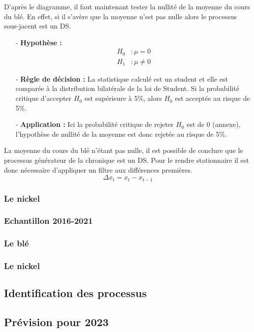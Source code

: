 %
D'après le diagramme, il faut maintenant tester la nullité de la moyenne du cours du blé. En effet, si il s'avère que la moyenne n'est pas nulle alors le processus 
sous-jacent est un DS.
\begin{itemize}
    \item[-]\textbf{Hypothèse :}
\begin{equation*}
\begin{split}
    H_{0} &: \mu = 0\\
    H_{1} &: \mu \neq 0
\end{split}
\end{equation*}
\item[-]\textbf{Règle de décision :} La statistique calculé est un student et elle est comparée à la distribution bilatérale de la loi de Student. Si la probabilité 
critique d'accepter $H_{0}$ est supérieure à 5\%, alors $H_{0}$ est acceptée au risque de 5\%.
\item[-]\textbf{Application :} Ici la probabilité critique de rejeter $H_{0}$ est de 0 (annexe), l'hypothèse de nullité de la moyenne est donc rejetée au risque de 5\%.
\end{itemize}
La moyenne du cours du blé n'étant pas nulle, il est possible de conclure que le processus générateur de la chronique est un DS. Pour le rendre stationnaire il est donc
nécessaire d'appliquer un filtre aux différences premières.
\begin{equation*}
    \Delta x_{t} = x_{t} - x_{t-1}
\end{equation*}
\subsubsection*{Le nickel}
\subsubsection{Echantillon 2016-2021}
\subsubsection*{Le blé}
\subsubsection*{Le nickel}
\subsection{Identification des processus}
\subsection{Prévision pour 2023}